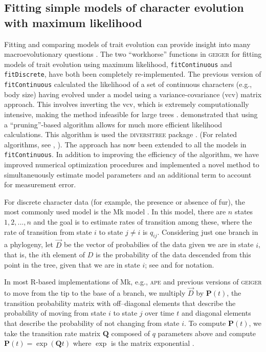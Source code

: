 \subsection{Fitting simple models of character evolution with maximum likelihood}

Fitting and comparing  models of trait evolution can provide insight into many macroevolutionary questions \citep{PennellHarmon}. The two ``workhorse'' functions in \textsc{geiger} for fitting models of trait evolution using maximum likelihood, \texttt{fitContinuous} and \texttt{fitDiscrete}, have both been completely re-implemented. The previous version of \texttt{fitContinuous} calculated the likelihood of a set of continuous characters (e.g., body size) having evolved under a model using a variance-covariance (vcv) matrix approach. This involves inverting the vcv, which is extremely computationally intensive, making the method infeasible for large trees \citep{Hadfield2010, FitzJohn2012, Freckleton2012, Ho2014}. \citet{FitzJohn2012} demonstrated that using a ``pruning''-based algorithm \citep{Felsenstein1973} allows for much more efficient likelihood calculations. This algorithm is used the \textsc{diversitree} package \citep{FitzJohn2012}. (For related algorithms, see \citealt{Freckleton2012}, \citealt{Ho2014}). The approach has now been extended to all the models in \texttt{fitContinuous}. In addition to improving the efficiency of the algorithm, we have improved numerical optimization procedures and implemented a novel method to simultaneuously estimate model parameters and an additional term to account for measurement error.

For discrete character data (for example, the presence or absence of fur), the most commonly used model is the Mk model \citep{Pagel1994, Lewis2001}.  In this model, there are $n$ states $1, 2, ..., n$ and the goal is to estimate rates of
transition among these, where the rate of transition from state $i$ to
state $j \neq i$ is $q_{ij}$.  Considering just one branch in a
phylogeny, let $\vec D$ be the vector of probabilies of the data given
we are in state $i$, that is, the $i$th element of $D$ is the
probability of the data descended from this point in the tree, given
that we are in state $i$; see \citet{Maddison2007} and \citet{FitzJohn2012}
for notation.

In most R-based implementations of Mk, e.g., \textsc{ape} \citep{ape}
and previous versions of \textsc{geiger} \citep{Harmon2008} to move from the
tip to the base of a branch, we multiply $\vec D$ by $\mathbf{P}(t)$, the
transition probability matrix with off--diagonal elements that describe
the probability of moving from state $i$ to state $j$ over time $t$
and diagonal elements that describe the probability of not changing
from state $i$.  To compute $\mathbf{P}(t)$, we take the transition rate matrix
$\mathbf{Q}$ composed of $q$ parameters above and compute
$\mathbf{P}(t) = \exp(\mathbf{Q} t)$ where $\exp$ is the matrix
exponential \citep{Sidje-1998-130}.

